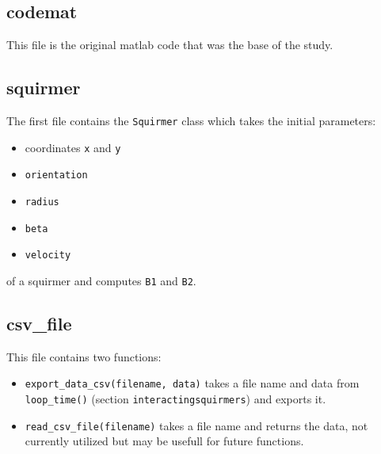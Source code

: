 \documentclass{article}
\begin{document}
\subsection{codemat}
This file is the original matlab code that was the base of the study.

\subsection{squirmer}
The first file contains the \texttt{Squirmer} class which takes the initial parameters: 
\begin{itemize}
   \item coordinates \texttt{x} and \texttt{y}
   \item \texttt{orientation}
   \item \texttt{radius}
   \item \texttt{beta}
   \item \texttt{velocity}
\end{itemize}
of a squirmer and computes \texttt{B1} and \texttt{B2}.

\subsection{csv\_file}
This file contains two functions:
\begin{itemize}
   \item \texttt{export\_data\_csv(filename, data)} takes a file name and data from \texttt{loop\_time()} (section \texttt{interactingsquirmers}) and exports it.
   \item \texttt{read\_csv\_file(filename)} takes a file name and returns the data, not currently utilized but may be usefull for future functions.
\end{itemize}
\end{document}
